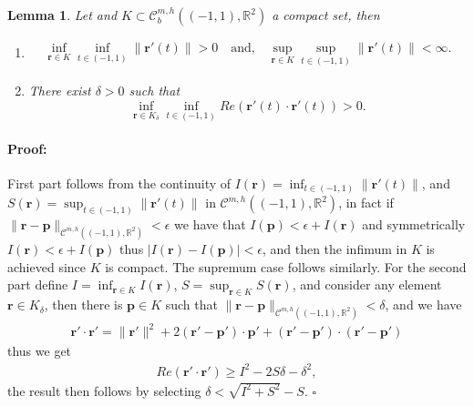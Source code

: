 \documentclass{article}
\newtheorem{lemma}[theorem]{Lemma}
\newenvironment{proof}{\paragraph{Proof:}}{\hfill$\square$}
\newcommand{\IR}{{\mathbb R}}
\newcommand{\bp}{{\bm p}}
\newcommand{\cmspaceh}[4]{\mathcal{C}^{#1,#2} \left( #3, #4 \right)}
\newcommand{\rgeoh}[2]{\mathcal{C}_b^{#1,#2}\left( (-1,1), \IR^2 \right)}
\newcommand{\br}{\bm{r}}
\begin{document}
\begin{lemma}
\label{lemma:dwelldef}
Let and $K \subset \rgeoh{m}{h}$ a compact set, then 
\begin{enumerate}
\item 
\begin{align*}
\inf_{\br \in K } \inf_{t \in (-1,1)} \| \br'(t) \|>0  \quad \text{and,} \quad  \sup_{\br \in K} \sup_{t \in (-1,1)} \| \br'(t)\| < \infty.
\end{align*}
\item 
There exist $\delta >0 $ such that  
$$ 
\inf_{\br \in K_\delta} \inf_{t \in (-1,1)}Re (\br'(t) \cdot \br'(t)) > 0 .$$
\end{enumerate}
\end{lemma}
\begin{proof}
First part follows from the continuity of $I(\br) = \inf_{t \in (-1,1)} \| \br'(t)\|$, and $S(\br) = \sup_{t \in (-1,1)} \| \br'(t)\|$ in $\cmspaceh{m}{h}{(-1,1)}{\IR^2}$, in fact if $\| \br -\bp \|_{\cmspaceh{m}{h}{(-1,1)}{\IR^2}}< \epsilon$ we have that 
$I(\bp)  < \epsilon + I(\br)$
and symmetrically 
$
I(\br)  < \epsilon + I(\bp)
$
thus $|I(\br) - I(\bp)| < \epsilon$, and then the infimum in $K$ is achieved since $K$ is compact. The supremum case follows similarly. For the second part define $I = \inf_{\br \in K } I(\br)$, $S =\sup_{\br \in K } S(\br)$, and consider any element $\br \in K_\delta$, then there is $\bp \in K$ such that $\| \br -\bp \|_{\cmspaceh{m}{h}{(-1,1)}{\IR^2}} < \delta$, and we have 
\begin{align*}
\br' \cdot \br' = \|\br'\|^2+ 2(\br' -\bp')\cdot \bp' +(\br'-\bp')\cdot(\br'-\bp') 
\end{align*}
thus we get
\begin{align*}
Re(\br' \cdot \br') \geq I^2 - 2S\delta -\delta^2, \end{align*}
the result then follows by selecting $\delta < \sqrt{I^2+S^2}-S$.
\end{proof} 
\end{document}
